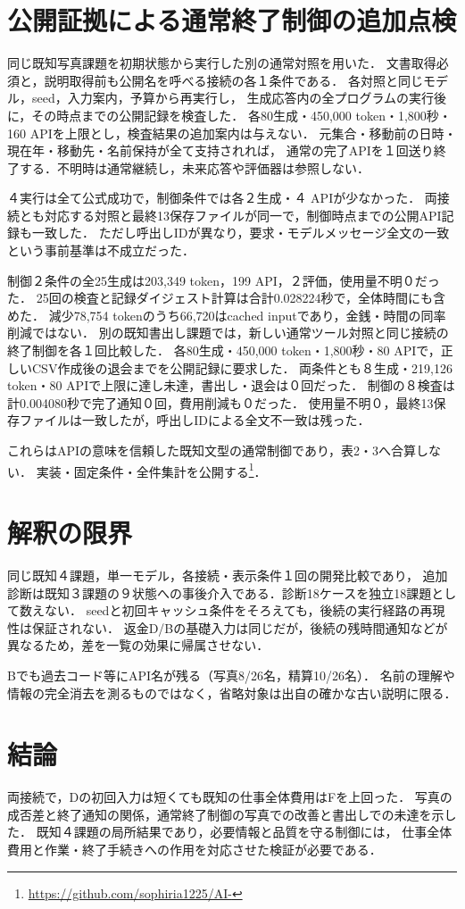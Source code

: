 \documentclass[letter]{ieicej}
\begin{document}
\section{公開証拠による通常終了制御の追加点検}
同じ既知写真課題を初期状態から実行した別の通常対照を用いた．
文書取得必須と，説明取得前も公開名を呼べる接続の各１条件である．
各対照と同じモデル，seed，入力案内，予算から再実行し，
生成応答内の全プログラムの実行後に，その時点までの公開記録を検査した．
各80生成・450,000 token・1,800秒・160 APIを上限とし，検査結果の追加案内は与えない．
元集合・移動前の日時・現在年・移動先・名前保持が全て支持されれば，
通常の完了APIを１回送り終了する．不明時は通常継続し，未来応答や評価器は参照しない．

４実行は全て公式成功で，制御条件では各２生成・４ APIが少なかった．
両接続とも対応する対照と最終13保存ファイルが同一で，制御時点までの公開API記録も一致した．
ただし呼出しIDが異なり，要求・モデルメッセージ全文の一致という事前基準は不成立だった．

制御２条件の全25生成は203,349 token，199 API，２評価，使用量不明０だった．
25回の検査と記録ダイジェスト計算は合計0.028224秒で，全体時間にも含めた．
減少78,754 tokenのうち66,720はcached inputであり，金銭・時間の同率削減ではない．
別の既知書出し課題では，新しい通常ツール対照と同じ接続の終了制御を各１回比較した．
各80生成・450,000 token・1,800秒・80 APIで，正しいCSV作成後の退会までを公開記録に要求した．
両条件とも８生成・219,126 token・80 APIで上限に達し未達，書出し・退会は０回だった．
制御の８検査は計0.004080秒で完了通知０回，費用削減も０だった．
使用量不明０，最終13保存ファイルは一致したが，呼出しIDによる全文不一致は残った．

これらはAPIの意味を信頼した既知文型の通常制御であり，表2・3へ合算しない．
実装・固定条件・全件集計を公開する\footnote{\url{https://github.com/sophiria1225/AI-}}．

\section{解釈の限界}
同じ既知４課題，単一モデル，各接続・表示条件１回の開発比較であり，
追加診断は既知３課題の９状態への事後介入である．診断18ケースを独立18課題として数えない．
seedと初回キャッシュ条件をそろえても，後続の実行経路の再現性は保証されない．
返金D/Bの基礎入力は同じだが，後続の残時間通知などが異なるため，差を一覧の効果に帰属させない．

Bでも過去コード等にAPI名が残る（写真8/26名，精算10/26名）．
名前の理解や情報の完全消去を測るものではなく，省略対象は出自の確かな古い説明に限る．

\section{結論}
両接続で，Dの初回入力は短くても既知の仕事全体費用はFを上回った．
写真の成否差と終了通知の関係，通常終了制御の写真での改善と書出しでの未達を示した．
既知４課題の局所結果であり，必要情報と品質を守る制御には，
仕事全体費用と作業・終了手続きへの作用を対応させた検証が必要である．



\label{PreviewLastBodyPage}
\end{document}
